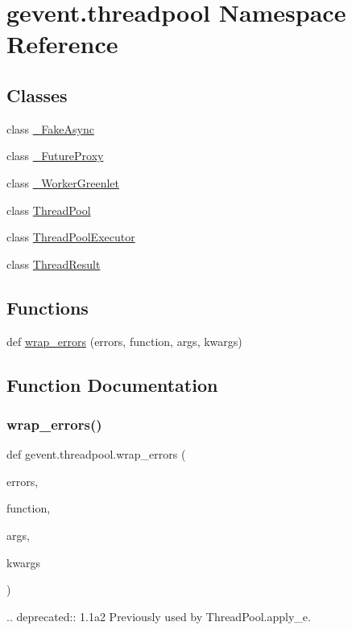 \hypertarget{namespacegevent_1_1threadpool}{}\section{gevent.\+threadpool Namespace Reference}
\label{namespacegevent_1_1threadpool}
\subsection*{Classes}
\begin{DoxyCompactItemize}
\item 
class \hyperlink{classgevent_1_1threadpool_1_1___fake_async}{\+\_\+\+Fake\+Async}
\item 
class \hyperlink{classgevent_1_1threadpool_1_1___future_proxy}{\+\_\+\+Future\+Proxy}
\item 
class \hyperlink{classgevent_1_1threadpool_1_1___worker_greenlet}{\+\_\+\+Worker\+Greenlet}
\item 
class \hyperlink{classgevent_1_1threadpool_1_1_thread_pool}{Thread\+Pool}
\item 
class \hyperlink{classgevent_1_1threadpool_1_1_thread_pool_executor}{Thread\+Pool\+Executor}
\item 
class \hyperlink{classgevent_1_1threadpool_1_1_thread_result}{Thread\+Result}
\end{DoxyCompactItemize}
\subsection*{Functions}
\begin{DoxyCompactItemize}
\item 
def \hyperlink{namespacegevent_1_1threadpool_a2049d47f6077954cb27e01c24b8bfdd0}{wrap\+\_\+errors} (errors, function, args, kwargs)
\end{DoxyCompactItemize}


\subsection{Function Documentation}
\mbox{\label{namespacegevent_1_1threadpool_a2049d47f6077954cb27e01c24b8bfdd0}} 
\subsubsection{\texorpdfstring{wrap\+\_\+errors()}{wrap\_errors()}}
{\footnotesize\ttfamily def gevent.\+threadpool.\+wrap\+\_\+errors (\begin{DoxyParamCaption}\item[{}]{errors,  }\item[{}]{function,  }\item[{}]{args,  }\item[{}]{kwargs }\end{DoxyParamCaption})}

\begin{DoxyVerb}.. deprecated:: 1.1a2
   Previously used by ThreadPool.apply_e.
\end{DoxyVerb}
 